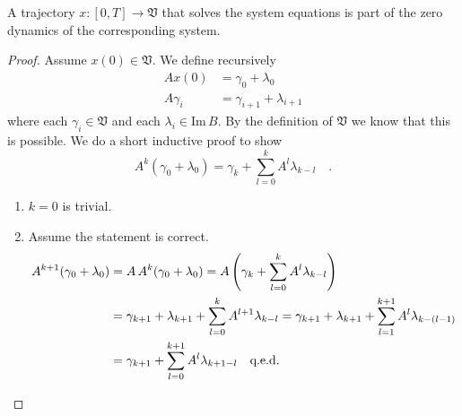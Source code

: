 \begin{proposition}{}{}
	A trajectory $x:[0,T]\to \mathfrak{V}$ that solves the system 
	equations is part of the zero dynamics of the 
	corresponding system.
\end{proposition}
\begin{proof}
	Assume $x(0)\in\mathfrak{V}$. We define recursively
	\begin{align*}
	A x(0) &= \gamma_0 + \lambda_0 \\
	A\gamma_{i} &= \gamma_{i+1} + \lambda_{i+1}
	\end{align*}
	where each $\gamma_i\in\mathfrak{V}$ and each $\lambda_i\in\text{Im}\, B$. By the 
	definition of $\mathfrak{V}$ we know that this is possible.
	We do a short inductive proof to show
	\begin{equation}
	A^k (\gamma_0+\lambda_0) = \gamma_k + \sum\limits_{l=0}^k A^l \lambda_{k-l} \quad .
	\end{equation}		
	\begin{enumerate}
		\item $k=0$ is trivial.
		\item Assume the statement is correct.
		\begin{align*}
		A^{k+1}(\gamma_0+\lambda_0) &= A \,A^k(\gamma_0+\lambda_0)
		= A \left(\gamma_k +\sum\limits_{l=0}^k A^l\lambda_{k-l} \right) 
		\\
		&= \gamma_{k+1} + \lambda_{k+1} + \sum\limits_{l=0}^k A^{l+1}\lambda_{k-l} 
		= \gamma_{k+1} +\lambda_{k+1} + \sum\limits_{l=1}^{k+1} A^{l} 
		\lambda_{k-(l-1)} \\
		&= \gamma_{k+1} + \sum\limits_{l=0}^{k+1} A^l \lambda_{k+1-l}
		\quad \text{q.e.d.} \quad
		\end{align*}
	\end{enumerate}


\end{proof}
